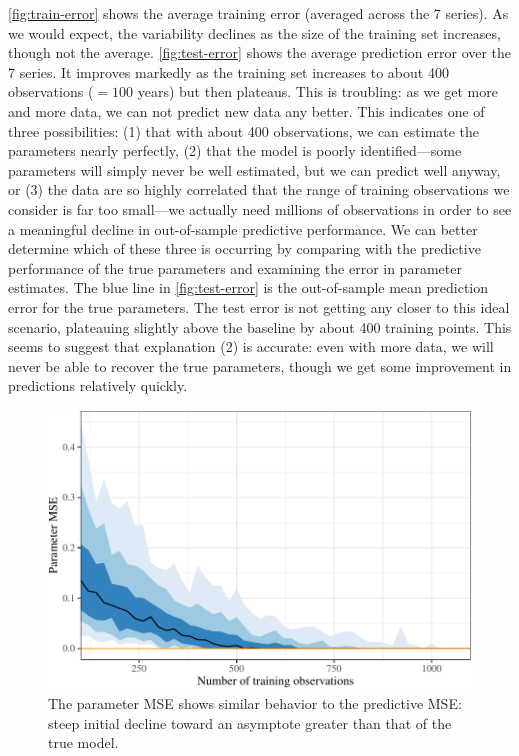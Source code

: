 \documentclass[11pt]{article}
\begin{document}
\autoref{fig:train-error} shows the average training error (averaged
across the 7 series). As we would expect, the variability declines as
the size of the training set increases, though not the average.
\autoref{fig:test-error} shows the average prediction error over the 7
series. It improves markedly as the training set increases to about 400
observations (\(=100\) years) but then plateaus. This is troubling: as
we get more and more data, we can not predict new data any better. This
indicates one of three possibilities: (1) that with about 400
observations, we can estimate the parameters nearly perfectly, (2) that
the model is poorly identified---some parameters will simply never be
well estimated, but we can predict well anyway, or (3) the data are so
highly correlated that the range of training observations we consider is
far too small---we actually need millions of observations in order to
see a meaningful decline in out-of-sample predictive performance. We can
better determine which of these three is occurring by comparing with the
predictive performance of the true parameters and examining the error in
parameter estimates. The blue line in \autoref{fig:test-error} is the
out-of-sample mean prediction error for the true parameters. The test
error is not getting any closer to this ideal scenario, plateauing
slightly above the baseline by about 400 training points. This seems to
suggest that explanation (2) is accurate: even with more data, we will
never be able to recover the true parameters, though we get some
improvement in predictions relatively quickly.

\begin{figure}[t]

{\centering \includegraphics{gfx/parm-error-1} 

}

\caption{The parameter MSE shows similar behavior to the predictive MSE: steep initial decline toward an asymptote greater than that of the true model.}\label{fig:parm-error}
\end{figure}
\end{document}

